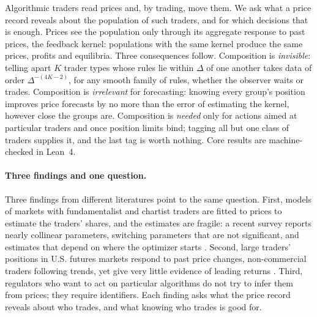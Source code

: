 
\noindent Algorithmic traders read prices and, by trading, move them. We ask what a price record reveals about the population of such traders, and for which decisions that is enough. Prices see the population only through its aggregate response to past prices, the feedback kernel: populations with the same kernel produce the same prices, profits and equilibria. Three consequences follow. Composition is \emph{invisible}: telling apart $K$ trader types whose rules lie within $\Delta$ of one another takes data of order $\Delta^{-(4K-2)}$, for any smooth family of rules, whether the observer waits or trades. Composition is \emph{irrelevant} for forecasting: knowing every group's position improves price forecasts by no more than the error of estimating the kernel, however close the groups are. Composition is \emph{needed} only for actions aimed at particular traders and once position limits bind; tagging all but one class of traders supplies it, and the last tag is worth nothing. Core results are machine-checked in Lean~4.

\paragraph{Three findings and one question.} Three findings from different literatures point to the same question. First, models of markets with fundamentalist and chartist traders \citep{brock1998,hommes2006} are fitted to prices to estimate the traders' shares, and the estimates are fragile: a recent survey reports nearly collinear parameters, switching parameters that are not significant, and estimates that depend on where the optimizer starts \citep{lux2018}. Second, large traders' positions in U.S. futures markets respond to past price changes, non-commercial traders following trends, yet give very little evidence of leading returns \citep{sanders2009}. Third, regulators who want to act on particular algorithms do not try to infer them from prices; they require identifiers. Each finding asks what the price record reveals about who trades, and what knowing who trades is good for.

